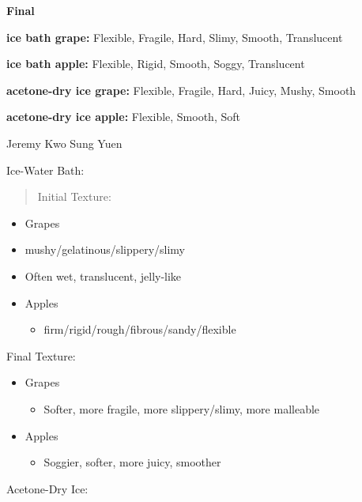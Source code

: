 \textbf{Final}

\textbf{ice bath grape:} Flexible, Fragile, Hard, Slimy, Smooth,
Translucent

\textbf{ice bath apple:} Flexible, Rigid, Smooth, Soggy, Translucent

\textbf{acetone-dry ice grape:} Flexible, Fragile, Hard, Juicy, Mushy,
Smooth

\textbf{acetone-dry ice apple:} Flexible, Smooth, Soft

Jeremy Kwo Sung Yuen

Ice-Water Bath:

\begin{quote}
Initial Texture:
\end{quote}

\begin{itemize}
\item
  Grapes
\end{itemize}

\begin{itemize}
\item
  mushy/gelatinous/slippery/slimy
\item
  Often wet, translucent, jelly-like
\end{itemize}

\begin{itemize}
\item
  Apples

  \begin{itemize}
  \item
    firm/rigid/rough/fibrous/sandy/flexible
  \end{itemize}
\end{itemize}

Final Texture:

\begin{itemize}
\item
  Grapes

  \begin{itemize}
  \item
    Softer, more fragile, more slippery/slimy, more malleable
  \end{itemize}
\item
  Apples

  \begin{itemize}
  \item
    Soggier, softer, more juicy, smoother
  \end{itemize}
\end{itemize}

Acetone-Dry Ice:

